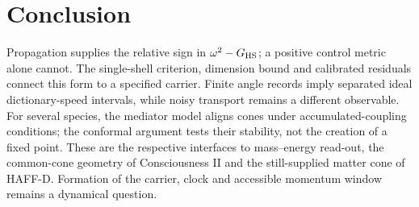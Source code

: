 \documentclass[12pt]{article}
\theoremstyle{definition}
\theoremstyle{remark}
\begin{document}
\section{Conclusion}

Propagation supplies the relative sign in $\omega^2-G_{\rm HS}$; a positive control metric alone cannot. The single-shell criterion, dimension bound and calibrated residuals connect this form to a specified carrier. Finite angle records imply separated ideal dictionary-speed intervals, while noisy transport remains a different observable. For several species, the mediator model aligns cones under accumulated-coupling conditions; the conformal argument tests their stability, not the creation of a fixed point. These are the respective interfaces to mass--energy read-out, the common-cone geometry of Consciousness II and the still-supplied matter cone of HAFF-D. Formation of the carrier, clock and accessible momentum window remains a dynamical question.
\end{document}
